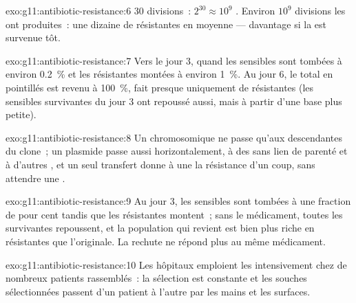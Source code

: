 \begin{solution}{exo:g11:antibiotic-resistance:6}
30 divisions~: $2^{30} \approx 10^9$ . Environ $10^9$ divisions
les ont produites~: une dizaine de  résistantes en moyenne ---
davantage si la  est survenue tôt.
\end{solution}

\begin{solution}{exo:g11:antibiotic-resistance:7}
Vers le jour 3, quand les  sensibles sont tombées à environ
0.2~\% et les résistantes montées à environ 1~\%. Au jour 6, le total
en pointillés est revenu à 100~\%, fait presque uniquement de 
résistantes (les sensibles survivantes du jour 3 ont repoussé aussi,
mais à partir d'une base plus petite).
\end{solution}

\begin{solution}{exo:g11:antibiotic-resistance:8}
Un  chromosomique ne passe qu'aux descendantes du clone~; un
plasmide passe aussi horizontalement, à des  sans lien de
parenté et à d'autres , et un seul transfert donne à une 
la résistance d'un coup, sans attendre une .
\end{solution}

\begin{solution}{exo:g11:antibiotic-resistance:9}
Au jour 3, les  sensibles sont tombées à une fraction de pour
cent tandis que les résistantes montent~; sans le médicament, toutes
les survivantes repoussent, et la population qui revient est bien plus
riche en  résistantes que l'originale. La rechute ne répond
plus au même médicament.
\end{solution}

\begin{solution}{exo:g11:antibiotic-resistance:10}
Les hôpitaux emploient les  intensivement chez de nombreux
patients rassemblés~: la sélection est constante et les souches
sélectionnées passent d'un patient à l'autre par les mains et les
surfaces.
\end{solution}

